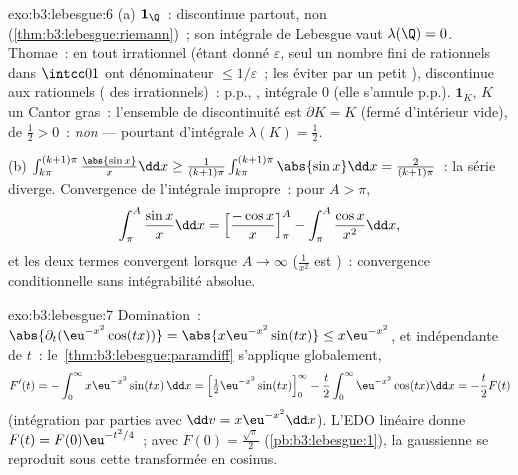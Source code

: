 \begin{solution}{exo:b3:lebesgue:6}
(a) $\mathbf 1_\Q$~: discontinue partout, non
 (\cref{thm:b3:lebesgue:riemann})~; son
intégrale de Lebesgue vaut $\lambda(\Q) = 0$. Thomae~:
 en tout irrationnel (étant donné $\varepsilon$,
seul un nombre fini de rationnels dans $\intcc01$ ont
dénominateur $\leq 1/\varepsilon$~; les éviter par un petit
), discontinue aux rationnels ( des
irrationnels)~:  p.p., ,
intégrale $0$ (elle s'annule p.p.). $\mathbf 1_K$, $K$ un
Cantor gras~: l'ensemble de discontinuité est $\partial K =
K$ (fermé d'intérieur vide), de  $\frac12 > 0$~:
\emph{non}  --- pourtant
 d'intégrale $\lambda(K) = \frac12$.

(b) $\int_{k\pi}^{(k+1)\pi}\frac{\abs{\sin x}}x\dd x \geq
\frac1{(k+1)\pi}\int_{k\pi}^{(k+1)\pi}\abs{\sin x}\dd x =
\frac{2}{(k+1)\pi}$~: la série diverge. Convergence de
l'intégrale impropre~: pour $A > \pi$,
\[
\int_\pi^A\frac{\sin x}x\dd x = \Bigl[\frac{-\cos
x}x\Bigr]_\pi^A - \int_\pi^A\frac{\cos x}{x^2}\dd x,
\]
et les deux termes convergent lorsque $A \to \infty$
($\frac1{x^2}$ est )~: convergence conditionnelle
sans intégrabilité absolue.
\end{solution}

\begin{solution}{exo:b3:lebesgue:7}
Domination~: $\abs{\partial_t(\eu^{-x^2}\cos(tx))} =
\abs{x\eu^{-x^2}\sin(tx)} \leq x\eu^{-x^2}$,  et
indépendante de $t$~: le~\cref{thm:b3:lebesgue:paramdiff}
s'applique globalement,
\[
F'(t) = -\int_0^\infty x\eu^{-x^2}\sin(tx)\,\dd x
= \Bigl[\tfrac12\eu^{-x^2}\sin(tx)\Bigr]_0^\infty
- \frac t2\int_0^\infty\eu^{-x^2}\cos(tx)\dd x
= -\frac t2F(t)
\]
(intégration par parties avec $\dd v = x\eu^{-x^2}\dd x$).
L'EDO linéaire donne $F(t) = F(0)\eu^{-t^2/4}$~; avec
$F(0) = \frac{\sqrt\pi}2$ (\cref{pb:b3:lebesgue:1}), la
gaussienne se reproduit sous cette transformée en cosinus.
\end{solution}

